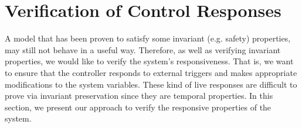 \section{Verification of Control Responses}
\label{sec:verificationResponses}

A model that has been proven to satisfy some invariant (e.g. safety) properties, 
may still not behave in a useful way.
Therefore, as well as verifying invariant properties, we would like to verify 
the system's responsiveness. That is, we want to ensure that the controller 
responds to external triggers and makes appropriate modifications to the system variables. 
These kind of live responses are difficult to prove via invariant
preservation since they are temporal properties.  In this section, we
present our approach to verify the responsive properties of the system.


